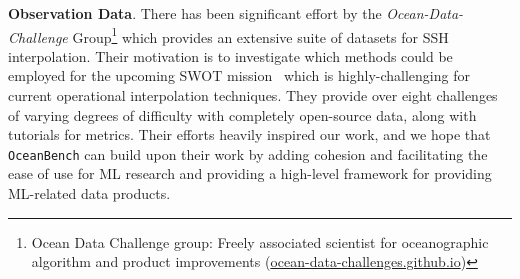 \textbf{Observation Data}. 
There has been significant effort by the \textit{Ocean-Data-Challenge} Group\footnote{Ocean Data Challenge group: Freely associated scientist for oceanographic algorithm and product improvements (\href{https://ocean-data-challenges.github.io/}{ocean-data-challenges.github.io})} which provides an extensive suite of datasets for SSH interpolation.
Their motivation is to investigate which methods could be employed for the upcoming SWOT mission~\cite{SWOT} which is highly-challenging for current operational interpolation techniques.
They provide over eight challenges of varying degrees of difficulty with completely open-source data, along with tutorials for metrics.
Their efforts heavily inspired our work, and we hope that \texttt{OceanBench} can build upon their work by adding cohesion and facilitating the ease of use for ML research and providing a high-level framework for providing ML-related data products.



